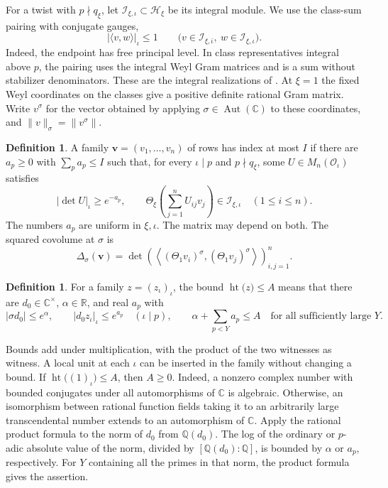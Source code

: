 \documentclass[11pt,reqno]{amsart}
\theoremstyle{definition}
\newtheorem{definition}[theorem]{Definition}
\numberwithin{equation}{section}
\newcommand{\CC}{\mathbb C}
\newcommand{\QQ}{\mathbb Q}
\newcommand{\RR}{\mathbb R}
\newcommand{\abs}[1]{\left|#1\right|}
\newcommand{\htle}[2]{\operatorname{ht}\bigl(#1\bigr)\le #2}
\newcommand{\of}{\mathcal O}
\begin{document}
For a twist with \(p\nmid q_\xi\), let
\(\mathcal I_{\xi,\iota}\subset\mathcal H_\xi\) be its integral
module. We use the class-sum pairing with conjugate gauges,
\begin{equation}\label{eq:int-pairing}
 \abs{\langle v,w\rangle}_\iota\le1
 \qquad
 \bigl(v\in\mathcal I_{\xi,\bar\iota},\
       w\in\mathcal I_{\xi,\iota}\bigr).
\end{equation}
Indeed, the endpoint has free principal level. In class
representatives integral above \(p\), the pairing uses the
integral Weyl Gram matrices and is a sum without stabilizer
denominators. These are the integral realizations of
\cite[\S6.13, Lemma~8.12, and {\rm(14.3)}]{chojecki}.
At \(\xi=1\) the fixed Weyl coordinates on the classes give a
positive definite rational Gram matrix. Write \(v^\sigma\) for
the vector obtained by applying \(\sigma\in\operatorname{Aut}(\CC)\)
to these coordinates, and \(\|v\|_\sigma=\|v^\sigma\|\).

\begin{definition}
A family \(\mathbf v=(v_1,\ldots,v_n)\) of rows has index at
most \(I\) if there are \(a_p\ge0\) with \(\sum_p a_p\le I\)
such that, for every \(\iota\mid p\) and \(p\nmid q_\xi\),
some \(U\in M_n(\of_\iota)\) satisfies
\[
 |\det U|_\iota\ge e^{-a_p},\qquad
 \Theta_\xi\left(\sum_{j=1}^n U_{ij}v_j\right)
       \in\mathcal I_{\xi,\iota}\quad (1\le i\le n).
\]
The numbers \(a_p\) are uniform in \(\xi,\iota\).
The matrix may depend on both. The squared covolume at
\(\sigma\) is
\[
 \Delta_\sigma(\mathbf v)=
 \det\left(\left\langle
       (\Theta_1 v_i)^\sigma,(\Theta_1 v_j)^\sigma
     \right\rangle\right)_{i,j=1}^n .
\]
\end{definition}

\begin{definition}
For a family \(z=(z_\iota)_\iota\), the bound
\(\htle{z}{A}\) means that there are \(d_0\in\CC^\times\),
\(\alpha\in\RR\), and real \(a_p\) with
\[
 |\sigma d_0|\le e^\alpha,\qquad
 |d_0z_\iota|_\iota\le e^{a_p}\quad(\iota\mid p),\qquad
 \alpha+\sum_{p<Y}a_p\le A
 \quad\text{for all sufficiently large \(Y\)}.
\]
\end{definition}

Bounds add under multiplication, with the product of the
two witnesses as witness. A local unit at each \(\iota\)
can be inserted in the family without changing a bound.
If \(\htle{(1)_\iota}{A}\), then \(A\ge0\).
Indeed, a nonzero complex number with bounded conjugates
under all automorphisms of \(\CC\) is algebraic. Otherwise,
an isomorphism between rational function fields taking it
to an arbitrarily large transcendental number extends to an
automorphism of \(\CC\). Apply the rational product formula
to the norm of \(d_0\) from \(\QQ(d_0)\). The log of the
ordinary or \(p\)-adic absolute value of the norm, divided
by \([\QQ(d_0):\QQ]\), is bounded by \(\alpha\) or \(a_p\),
respectively. For \(Y\) containing all the primes in that norm,
the product formula gives the assertion.
\end{document}
